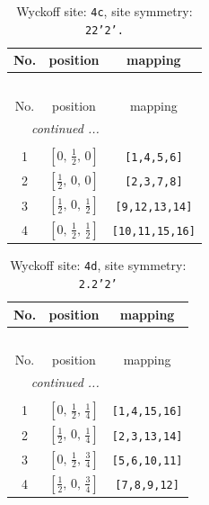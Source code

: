 \documentclass[fleqn,8pt]{jsarticle}
\begin{document}
\renewcommand{\arraystretch}{1.2}
\begin{longtable}{ccc}
\caption{Wyckoff site: {\tt 4c}, site symmetry: {\tt 22'2'.}}
 \\
 \hline \hline
No. & position & mapping \\ \hline \endfirsthead

\multicolumn{2}{l}{\tablename\ \thetable{}} \\
 \hline \hline
No. & position & mapping \\ \hline \endhead

 \hline \hline
\multicolumn{2}{r}{\footnotesize\it continued ...} \\ \endfoot

 \hline \hline
\multicolumn{2}{r}{} \\ \endlastfoot

1 & $\left[ 0,\, \frac{1}{2},\, 0 \right]$ & {\tt [1,4,5,6]} \\ \hline
2 & $\left[ \frac{1}{2},\, 0,\, 0 \right]$ & {\tt [2,3,7,8]} \\ \hline
3 & $\left[ \frac{1}{2},\, 0,\, \frac{1}{2} \right]$ & {\tt [9,12,13,14]} \\ \hline
4 & $\left[ 0,\, \frac{1}{2},\, \frac{1}{2} \right]$ & {\tt [10,11,15,16]} \\
\end{longtable}
\renewcommand{\arraystretch}{1.2}
\begin{longtable}{ccc}
\caption{Wyckoff site: {\tt 4d}, site symmetry: {\tt 2.2'2'}}
 \\
 \hline \hline
No. & position & mapping \\ \hline \endfirsthead

\multicolumn{2}{l}{\tablename\ \thetable{}} \\
 \hline \hline
No. & position & mapping \\ \hline \endhead

 \hline \hline
\multicolumn{2}{r}{\footnotesize\it continued ...} \\ \endfoot

 \hline \hline
\multicolumn{2}{r}{} \\ \endlastfoot

1 & $\left[ 0,\, \frac{1}{2},\, \frac{1}{4} \right]$ & {\tt [1,4,15,16]} \\ \hline
2 & $\left[ \frac{1}{2},\, 0,\, \frac{1}{4} \right]$ & {\tt [2,3,13,14]} \\ \hline
3 & $\left[ 0,\, \frac{1}{2},\, \frac{3}{4} \right]$ & {\tt [5,6,10,11]} \\ \hline
4 & $\left[ \frac{1}{2},\, 0,\, \frac{3}{4} \right]$ & {\tt [7,8,9,12]} \\
\end{longtable}
\end{document}
